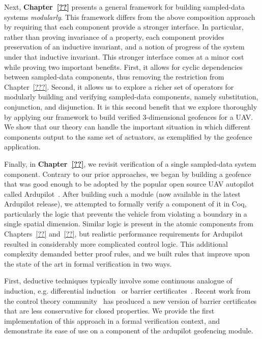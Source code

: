 \documentclass[12pt]{ucsddissertation}
\begin{document}
\begin{dissertationintroduction}
Next, \textbf{Chapter~\ref{??}} presents a general framework for building
sampled-data systems \emph{modularly}. This framework differs from the
above composition approach by requiring that each component provide a
stronger interface. In particular, rather than proving invariance of a
property, each component provides preservation of an inductive invariant,
and a notion of progress of the system under that inductive invariant. This
stronger interface comes at a minor cost while proving two important
benefits. First, it allows for cyclic dependencies between sampled-data
components, thus removing the restriction from Chapter~\ref{???}. Second,
it allows us to explore a richer set of operators for modularly building
and verifying sampled-data components, namely substitution, conjunction,
and disjunction. It is this second benefit that we explore thoroughly by
applying our framework to build verified 3-dimensional geofences for a
UAV. We show that our theory can handle the important situation in which
different components output to the same set of actuators, as exemplified by
the geofence application.

Finally, in \textbf{Chapter~\ref{??}}, we revisit verification of a single
sampled-data system component. Contrary to our prior approaches, we began
by building a geofence that was good enough to be adopted by the popular
open source UAV autopilot called Ardupilot~\cite{???}. After building such
a module (now available in the latest Ardupilot release), we attempted to
formally verify a component of it in Coq, particularly the logic that
prevents the vehicle from violating a boundary in a single spatial
dimension. Similar logic is present in the atomic components from
Chapters~\ref{??}  and~\ref{??}, but realistic performance requirements for
Ardupilot resulted in considerably more complicated control logic. This
additional complexity demanded better proof rules, and we built rules that
improve upon the state of the art in formal verification in two ways.

First, deductive techniques typically involve some continuous analogue of
induction, e.g. differential induction~\cite{Ghorbal14diffinv} or barrier
certificates~\cite{prajna04barrier}. Recent work from the control theory
community~\cite{kong2013barrier,xu15barrier,nguyen16barrier} has produced a
new version of barrier certificates that are less conservative for closed
properties. We provide the first implementation of this approach in a
formal verification context, and demonstrate its ease of use on a component
of the ardupilot geofencing module.


\end{dissertationintroduction}
\end{document}
